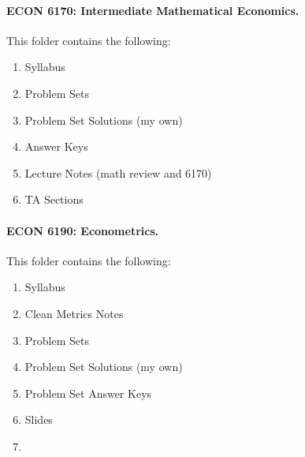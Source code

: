 \documentclass[12pt]{article}
\begin{document}
	
	\paragraph{ECON 6170: Intermediate Mathematical Economics.} This folder contains the following:
	\begin{enumerate}
		\item Syllabus
		\item Problem Sets
		\item Problem Set Solutions (my own)
		\item Answer Keys
		\item Lecture Notes (math review and 6170)
		\item TA Sections
	\end{enumerate}
	
	
	\paragraph{ECON 6190: Econometrics.} This folder contains the following:
	\begin{enumerate}
		\item Syllabus
		\item Clean Metrics Notes
		\item Problem Sets
		\item Problem Set Solutions (my own)
		\item Problem Set Answer Keys
		\item Slides
		\item 
	\end{enumerate}
	
	
	
	
	
	
	
	
	
	
	
	
	
	
	
	
	
	
	
	
\end{document}
